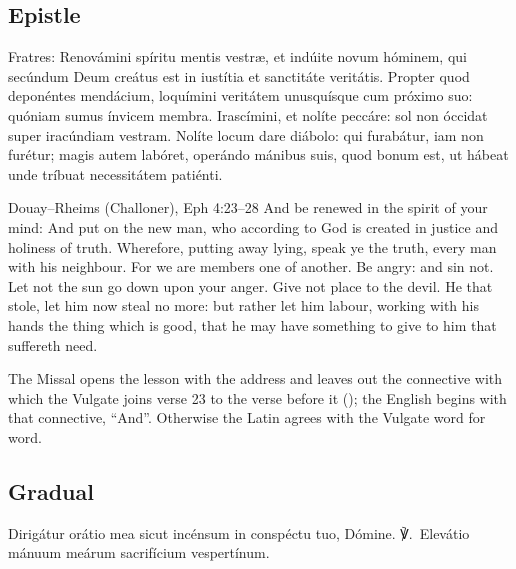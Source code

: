 \subsection{Epistle}
\label{proper-epistle}


\begin{latinproper}
Fratres: Renovámini spíritu mentis vestræ, et indúite novum hóminem, qui
secúndum Deum creátus est in iustítia et sanctitáte veritátis. Propter quod
deponéntes mendácium, loquímini veritátem unusquísque cum próximo suo: quóniam
sumus ínvicem membra. Irascímini, et nolíte peccáre: sol non óccidat super
iracúndiam vestram. Nolíte locum dare diábolo: qui furabátur, iam non furétur;
magis autem labóret, operándo mánibus suis, quod bonum est, ut hábeat unde
tríbuat necessitátem patiénti.
\end{latinproper}

\begin{englishwitness}{Douay--Rheims (Challoner), Eph 4:23--28}
And be renewed in the spirit of your mind: And put on the new man, who
according to God is created in justice and holiness of truth. Wherefore,
putting away lying, speak ye the truth, every man with his neighbour. For we
are members one of another. Be angry: and sin not. Let not the sun go down upon
your anger. Give not place to the devil. He that stole, let him now steal no
more: but rather let him labour, working with his hands the thing which is
good, that he may have something to give to him that suffereth need.
\end{englishwitness}

\noindent The Missal opens the lesson with the address  and
leaves out the connective with which the Vulgate joins verse 23 to the verse
before it (); the English begins with that connective,
``And''. Otherwise the Latin agrees with the Vulgate word for word.

\subsection{Gradual}
\label{proper-gradual}


\begin{latinproper}
Dirigátur orátio mea sicut incénsum in conspéctu tuo, Dómine. ℣.~Elevátio
mánuum meárum sacrifícium vespertínum.
\end{latinproper}

